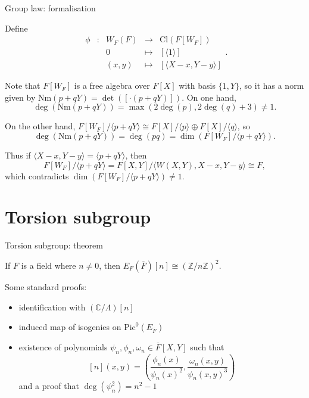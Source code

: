 \documentclass[10pt]{beamer}
\begin{document}
\begin{frame}[t]{Group law: formalisation}

Define
$$
\begin{array}{rcrcl}
\phi & : & W_F(F) & \longrightarrow & \mathrm{Cl}(F[W_F]) \\
& & 0 & \longmapsto & [\langle 1 \rangle] \\
& & (x, y) & \longmapsto & [\langle X - x, Y - y \rangle]
\end{array}.
$$

\pause

Note that $ F[W_F] $ is a free algebra over $ F[X] $ with basis $ \{1, Y\} $, so it has a norm given by $ \mathrm{Nm}(p + qY) = \det([\cdot (p + qY)]) $. \pause On one hand,
$$ \deg(\mathrm{Nm}(p + qY)) = \max(2\deg(p), 2\deg(q) + 3) \ne 1. $$

\pause

On the other hand, $ F[W_F] / \langle p + qY\rangle \cong F[X] / \langle p\rangle \oplus F[X] / \langle q\rangle $, so
$$ \deg(\mathrm{Nm}(p + qY)) = \deg(pq) = \dim(F[W_F] / \langle p + qY\rangle). $$

\pause

Thus if $ \langle X - x, Y - y \rangle = \langle p + qY\rangle $, then
$$ F[W_F] / \langle p + qY\rangle = F[X, Y] / \langle W(X, Y), X - x, Y - y\rangle \cong F, $$
which contradicts $ \dim(F[W_F] / \langle p + qY\rangle) \ne 1 $.

\end{frame}

\section{Torsion subgroup}

\begin{frame}[t]{Torsion subgroup: theorem}

\begin{theorem}
If $ F $ is a field where $ n \ne 0 $, then $ E_F(\overline{F})[n] \cong (\mathbb{Z} / n\mathbb{Z})^2 $.
\end{theorem}

\pause

\vspace{0.5cm}

Some standard proofs:
\begin{itemize}
\item identification with $ (\mathbb{C} / \Lambda)[n] $

\pause

\item induced map of isogenies on $ \mathrm{Pic}^0(E_{\overline{F}}) $

\pause

\item existence of polynomials $ \psi_n, \phi_n, \omega_n \in \overline{F}[X, Y] $ such that
$$ [n](x, y) = \left(\dfrac{\phi_n(x)}{\psi_n(x)^2}, \dfrac{\omega_n(x, y)}{\psi_n(x, y)^3}\right) $$
and a proof that $ \deg(\psi_n^2) = n^2 - 1 $
\end{itemize}

\end{frame}
\end{document}
